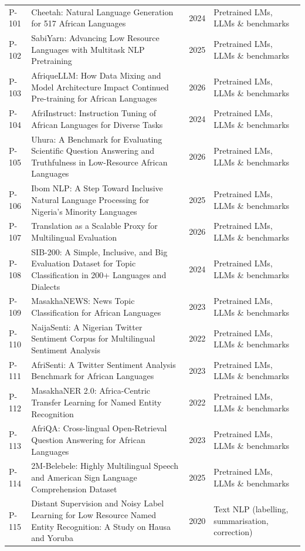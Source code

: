\begin{longtable}{@{}p{} p{} p{} p{}@{}}
P-101 & Cheetah: Natural Language Generation for 517 African Languages & 2024 & Pretrained LMs, LLMs \& benchmarks \\
P-102 & SabiYarn: Advancing Low Resource Languages with Multitask NLP Pretraining & 2025 & Pretrained LMs, LLMs \& benchmarks \\
P-103 & AfriqueLLM: How Data Mixing and Model Architecture Impact Continued Pre-training for African Languages & 2026 & Pretrained LMs, LLMs \& benchmarks \\
P-104 & AfriInstruct: Instruction Tuning of African Languages for Diverse Tasks & 2024 & Pretrained LMs, LLMs \& benchmarks \\
P-105 & Uhura: A Benchmark for Evaluating Scientific Question Answering and Truthfulness in Low-Resource African Languages & 2026 & Pretrained LMs, LLMs \& benchmarks \\
P-106 & Ibom NLP: A Step Toward Inclusive Natural Language Processing for Nigeria's Minority Languages & 2025 & Pretrained LMs, LLMs \& benchmarks \\
P-107 & Translation as a Scalable Proxy for Multilingual Evaluation & 2026 & Pretrained LMs, LLMs \& benchmarks \\
P-108 & SIB-200: A Simple, Inclusive, and Big Evaluation Dataset for Topic Classification in 200+ Languages and Dialects & 2024 & Pretrained LMs, LLMs \& benchmarks \\
P-109 & MasakhaNEWS: News Topic Classification for African Languages & 2023 & Pretrained LMs, LLMs \& benchmarks \\
P-110 & NaijaSenti: A Nigerian Twitter Sentiment Corpus for Multilingual Sentiment Analysis & 2022 & Pretrained LMs, LLMs \& benchmarks \\
P-111 & AfriSenti: A Twitter Sentiment Analysis Benchmark for African Languages & 2023 & Pretrained LMs, LLMs \& benchmarks \\
P-112 & MasakhaNER 2.0: Africa-Centric Transfer Learning for Named Entity Recognition & 2022 & Pretrained LMs, LLMs \& benchmarks \\
P-113 & AfriQA: Cross-lingual Open-Retrieval Question Answering for African Languages & 2023 & Pretrained LMs, LLMs \& benchmarks \\
P-114 & 2M-Belebele: Highly Multilingual Speech and American Sign Language Comprehension Dataset & 2025 & Pretrained LMs, LLMs \& benchmarks \\
P-115 & Distant Supervision and Noisy Label Learning for Low Resource Named Entity Recognition: A Study on Hausa and Yoruba & 2020 & Text NLP (labelling, summarisation, correction) \\

\end{longtable}
